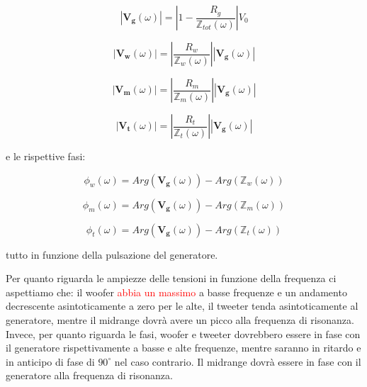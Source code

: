 \documentclass[12pt,italian]{article}
\newcommand{\err}[1]{\textcolor{red}{#1}}
\begin{document}
\begin{equation}
	\left| \mathbf{V_{g}}(\omega) \right| = \left| 1 - \frac{R_g}
	{\mathbb{Z}_{tot}(\omega)}\right| V_{0}
	\label{eq:Vg}
\end{equation}

\begin{equation}
	\left| \mathbf{V_{w}}(\omega) \right| = \left| \frac{R_{w}}
	{\mathbb{Z}_{w}(\omega)}\right|\left| \mathbf{V_{g}}(\omega) \right|
	\label{eq:Vw}
\end{equation}

\begin{equation}
	\left| \mathbf{V_{m}}(\omega) \right| = \left| \frac{R_{m}}
	{\mathbb{Z}_{m}(\omega)}\right|\left| \mathbf{V_{g}}(\omega) \right|
	\label{eq:Vm}
\end{equation}

\begin{equation}
	\left| \mathbf{V_{t}}(\omega) \right| = \left| \frac{R_{t}}
	{\mathbb{Z}_{t}(\omega)}\right|\left| \mathbf{V_{g}}(\omega) \right|
	\label{eq:Vt}
\end{equation}

\noindent
e le rispettive fasi:

\begin{equation}
	\phi_{w}(\omega) = Arg(\mathbf{V_{g}}(\omega)) - Arg(\mathbb{Z}_{w}(\omega))
\end{equation}

\begin{equation}
	\phi_{m}(\omega) = Arg(\mathbf{V_{g}}(\omega)) - Arg(\mathbb{Z}_{m}(\omega))
\end{equation}

\begin{equation}
	\phi_{t}(\omega) =  Arg(\mathbf{V_{g}}(\omega)) - Arg(\mathbb{Z}_{t}(\omega))
\end{equation}

\noindent
tutto in funzione della pulsazione del generatore.

Per quanto riguarda le ampiezze delle tensioni in funzione della frequenza ci
aspettiamo che: il woofer \err{abbia un massimo} a basse frequenze e un
andamento decrescente asintoticamente a zero per le alte, il tweeter tenda
asintoticamente al generatore, mentre il midrange dovrà avere un picco alla
frequenza di risonanza. Invece, per quanto riguarda le fasi, woofer e tweeter
dovrebbero essere in fase con il generatore rispettivamente a basse e alte
frequenze, mentre saranno in ritardo e in anticipo di fase di $90^\circ$ nel
caso contrario. Il midrange dovrà essere in fase con il generatore alla
frequenza di risonanza.
\end{document}
